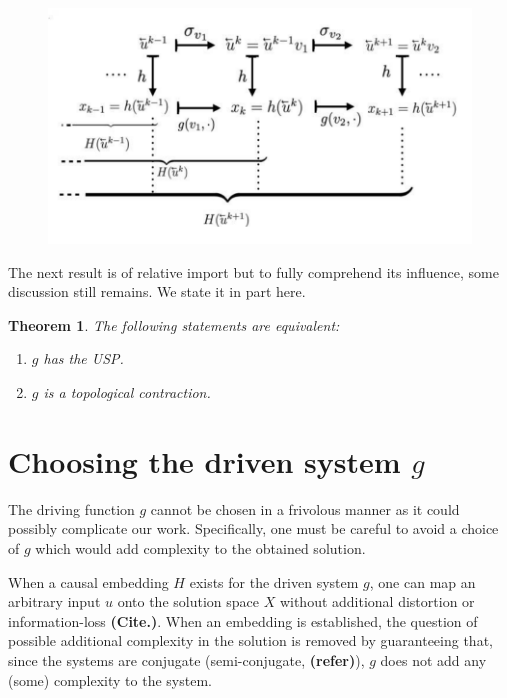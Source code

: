 \documentclass[a4paper,12pt,twoside]{report}
\newtheorem{Theorem}{Theorem}[]
\begin{document}
\begin{figure}[ht]
  \includegraphics[scale=0.3]{_actionofh_H.png}
  \centering
  \label{fig:actionh_H}
\end{figure}

The next result is of relative import but to fully comprehend its influence, some discussion still remains. We state it in part here.

\begin{Theorem}
  The following statements are equivalent:
  \vspace{-8mm}
  \begin{enumerate}[noitemsep, label=\roman*.]
    \item $g$ has the USP. 
    \item $g$ is a topological contraction.
  \end{enumerate}
\end{Theorem}


\section{Choosing the driven system $g$}

The driving function $g$ cannot be chosen in a frivolous manner as it could possibly complicate our work. Specifically, one must be careful to avoid a choice of $g$ which would  add complexity to the obtained solution.  

When a causal embedding $H$ exists for the driven system $g$, one can map an arbitrary input ${u}$ onto the solution space $X$ without additional distortion or information-loss \textbf{(Cite.)}.
When an embedding is established, the question of possible additional complexity in the solution is removed by guaranteeing that, since the systems are conjugate (semi-conjugate, \textbf{(refer)}), $g$ does not add any (some) complexity to the system.  
\end{document}
